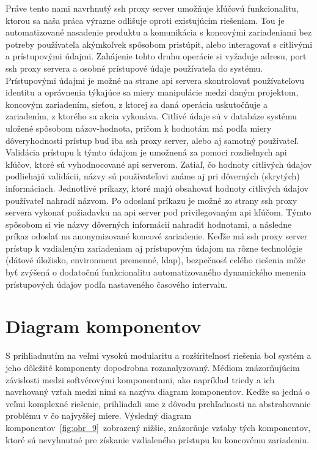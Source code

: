 Práve tento nami navrhnutý ssh proxy server umožňuje kľúčovú funkcionalitu, ktorou sa naša práca výrazne odlišuje oproti
existujúcim riešeniam.
Tou je automatizované nasadenie produktu a komunikácia s koncovými zariadeniami bez potreby používateľa akýmkoľvek spôsobom pristúpiť,
alebo interagovať s citlivými a prístupovými údajmi.
Zahájenie tohto druhu operácie si vyžaduje adresu, port ssh proxy servera a osobné prístupové údaje používateľa do systému.
Prístupovými údajmi je možné na strane api servera skontrolovať používateľovu identitu a oprávnenia týkajúce sa miery manipulácie
medzi daným projektom, koncovým zariadením, sieťou, z ktorej sa daná operácia uskutočňuje a zariadením, z ktorého sa akcia vykonáva.
Citlivé údaje sú v databáze systému uložené spôsobom názov-hodnota, pričom k hodnotám má podľa miery dôveryhodnosti prístup buď
iba ssh proxy server, alebo aj samotný používateľ.
Validácia prístupu k týmto údajom je umožnená za pomoci rozdielnych api kľúčov, ktoré sú vyhodnocované api serverom.
Zatiaľ, čo hodnoty citlivých údajov podliehajú validácii, názvy sú používateľovi známe aj pri dôverných (skrytých) informáciach.
Jednotlivé príkazy, ktoré majú obsahovať hodnoty citlivých údajov používateľ nahradí názvom.
Po odoslaní príkazu je možné zo strany ssh proxy servera vykonať požiadavku na api server pod privilegovaným api kľúčom.
Týmto spôsobom si vie názvy dôverných informácií nahradiť hodnotami, a následne príkaz odoslať na anonymizované koncové zariadenie.
Keďže má ssh proxy server prístup k vzdialeným zariadeniam aj prístupovým údajom na rôzne technológie (dátové úložisko, environment premenné, ldap),
bezpečnosť celého riešenia môže byť zvýšená o dodatočnú funkcionalitu automatizovaného dynamického menenia prístupových údajov
podľa nastaveného časového intervalu.

\section{Diagram komponentov}\label{sec:diagram-komponentov}

S prihliadnutím na veľmi vysokú modularitu a rozšíriteľnosť riešenia bol systém a jeho dôležité komponenty dopodrobna rozanalyzovaný.
Médiom znázorňujúcim závislosti medzi softvérovými komponentami, ako napríklad triedy a ich navrhovaný vzťah medzi
nimi sa nazýva diagram komponentov.
Keďže sa jedná o veľmi komplexné riešenie, prihliadali sme z dôvodu prehľadnosti na abstrahovanie problému v čo najvyššej miere.
Výsledný diagram komponentov~\ref{fig:obr_9}~zobrazený nižšie, znázorňuje vzťahy tých komponentov, ktoré sú nevyhnutné pre
získanie vzdialeného prístupu ku koncovému zariadeniu.

